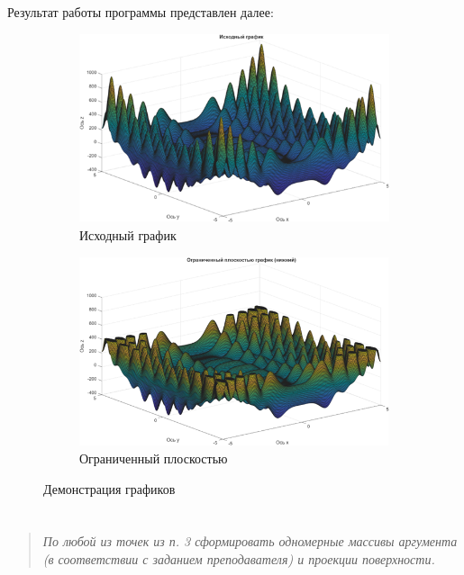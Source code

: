 Результат работы программы представлен далее:
\begin{figure}[H]
    \centering

    \begin{subfigure}{0.48\textwidth}
        \centering
        \includegraphics[width=\linewidth]{figs/ex4_1.png}
        \caption{Исходный график}
        \label{fig:Исходный график}
    \end{subfigure}
    \hfill
    \begin{subfigure}{0.48\textwidth}
        \centering
        \includegraphics[width=\linewidth]{figs/ex4_2.png}
        \caption{Ограниченный плоскостью}
        \label{fig:Ограниченный плоскостью}
    \end{subfigure}

     \caption{Демонстрация графиков}
    \label{fig:graphics_demo}
\end{figure}

\section*{  }
\begin{quote}
    \textit{По любой из точек из п. 3 сформировать одномерные массивы аргумента (в соответствии с заданием преподавателя) и проекции поверхности.}
\end{quote}


